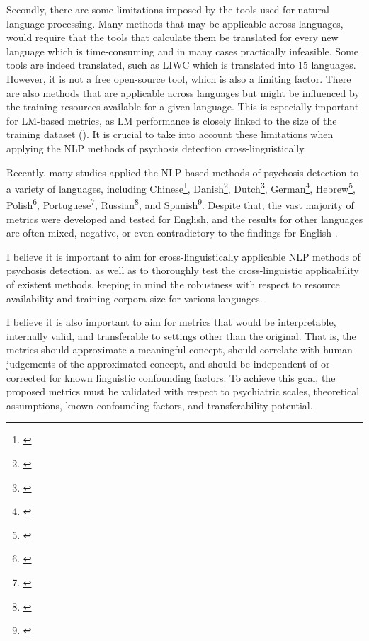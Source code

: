 Secondly, there are some limitations imposed by the tools used for natural language processing. Many methods that may be applicable across languages, would require that the tools that calculate them be translated for every new language which is time-consuming and in many cases practically infeasible. Some tools are indeed translated, such as LIWC which is translated into 15 languages. However, it is not a free open-source tool, which is also a limiting factor. There are also methods that are applicable across languages but might be influenced by the training resources available for a given language. This is especially important for LM-based metrics, as LM performance is closely linked to the size of the training dataset (\cite{kaplan2020scaling}). It is crucial to take into account these limitations when applying the NLP methods of psychosis detection cross-linguistically.

Recently, many studies applied the NLP-based methods of psychosis detection to a variety of languages, including Chinese\footnote{\cite{parola2022speech}}, Danish\footnote{\cite{parola2022speech}}, Dutch\footnote{\cite{dore2019quantification, voppel2021quantified, wouts2021belabbert, corona2022assessing, voppel2023semantic, de2023acoustic}}, German\footnote{\cite{koranova2017analyzing, just2019coherence, just2020modeling, parola2022speech, schneider2023syntactic}}, Hebrew\footnote{\cite{bar2019semantic, ziv2022morphological, shriki2022masking}}, Polish\footnote{\cite{sarzynska2021detecting}}, Portuguese\footnote{\cite{mota2014graph, mota2017thought, mota2022happy, argolo2023burnishing}}, Russian\footnote{\cite{panicheva2019semantic, panicheva2020corpus, ryazanskaya2020automated}}, and Spanish\footnote{\cite{palominos2023coreference}}. Despite that, the vast majority of metrics were developed and tested for English, and the results for other languages are often mixed, negative, or even contradictory to the findings for English \citep{koranova2017analyzing, bar2019semantic, panicheva2019semantic, dore2019quantification, parola2022speech}. 

I believe it is important to aim for cross-linguistically applicable NLP methods of psychosis detection, as well as to thoroughly test the cross-linguistic applicability of existent methods, keeping in mind the robustness with respect to resource availability and training corpora size for various languages.

I believe it is also important to aim for metrics that would be interpretable, internally valid, and transferable to settings other than the original. That is, the metrics should approximate a meaningful concept, should correlate with human judgements of the approximated concept, and should be independent of or corrected for known linguistic confounding factors. To achieve this goal, the proposed metrics must be validated with respect to psychiatric scales, theoretical assumptions, known confounding factors, and transferability potential.


